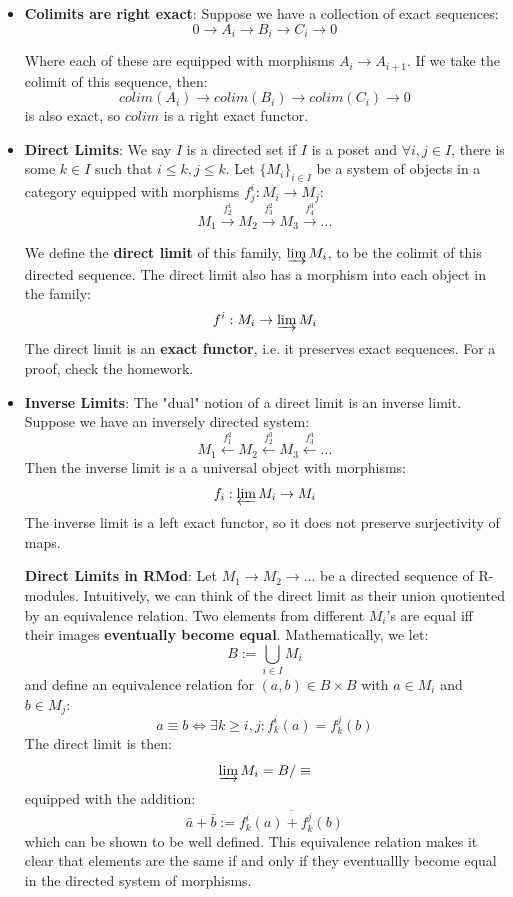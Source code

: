 \documentclass[11pt, oneside]{amsart}   	%
\theoremstyle{definition}
\begin{document}
\begin{itemize}
	\item \textbf{Colimits are right exact}: Suppose we have a collection of exact sequences:
	$$
		0\rightarrow A_i\rightarrow B_i\rightarrow C_i\rightarrow 0
	$$
	
	Where each of these are equipped with morphisms $A_i\rightarrow A_{i + 1}$. If we take the colimit of this sequence, then:
	$$
		colim (A_i)\rightarrow colim (B_i)\rightarrow colim(C_i)\rightarrow 0
	$$
	is also exact, so $colim$ is a right exact functor.
	
	\item \textbf{Direct Limits}: We say $I$ is a directed set if $I$ is a poset and $\forall i, j\in I$, there is some $k\in I$ such that $i\leq k, j\leq k$. Let  
	$\{M_i\}_{i\in I}$ be a system of objects in a category equipped with morphisms $f^i_j : M_i\rightarrow M_{j}$:
	$$
		M_1\xrightarrow{f^1_2} M_2\xrightarrow{f^2_3} M_3\xrightarrow{f^3_4} ...
	$$
	
	We define the \textbf{direct limit} of this family, $\varinjlim M_i$, to be the colimit of this directed sequence. The direct limit also has a morphism 
	into each object in the family:
	$$
		f^i : M_i\rightarrow \varinjlim M_i
	$$
	The direct limit is an \textbf{exact 
	functor}, i.e. it preserves exact sequences. For a proof, check the homework.
	
	\item \textbf{Inverse Limits}: The "dual" notion of a direct limit is an inverse limit. Suppose we have an inversely directed system:
	$$
		M_1\xleftarrow{f^2_1} M_2\xleftarrow{f^3_2} M_3\xleftarrow{f^4_3} ...
	$$
	Then the inverse limit is a a universal object with morphisms:
	$$
		f_i : \varprojlim M_i \rightarrow M_i
	$$
	The inverse limit is a left exact functor, so it does not preserve surjectivity of maps.
	
	\textbf{Direct Limits in RMod}: Let $M_1\rightarrow M_2\rightarrow ...$ be a directed sequence of R-modules. Intuitively, we can think of the direct 
	limit as their union quotiented by an equivalence relation. Two elements from different $M_i$'s are equal iff their images \textbf{eventually become 
	equal}. Mathematically, we let:
	$$
		B := \bigcup_{i\in I}M_i
	$$
	and define an equivalence relation for $(a, b)\in B\times B$ with $a\in M_i$ and $b\in M_j$:
	$$
		a\equiv b \iff \exists k\geq i, j : f^i_k(a) = f^j_k(b)
	$$
	The direct limit is then:
	$$
		\varinjlim M_i = B / \equiv
	$$
	equipped with the addition:
	$$
		\bar a + \bar b := \overline{f^i_k(a) + f^j_k(b)}
	$$
	which can be shown to be well defined. This equivalence relation makes it clear that elements are the same if and only if they eventuallly become 
	equal in the directed system of morphisms.

\end{itemize}
\end{document}
